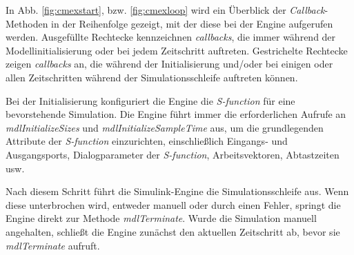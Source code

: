 In Abb. \ref{fig:cmexstart}, bzw. \ref{fig:cmexloop} wird ein Überblick der \textit{Callback}-Methoden in der Reihenfolge gezeigt, mit der diese bei der Engine aufgerufen werden.  Ausgefüllte Rechtecke kennzeichnen \textit{callbacks}, die immer während der Modellinitialisierung oder bei jedem Zeitschritt auftreten. Gestrichelte Rechtecke zeigen \textit{callbacks} an, die während der Initialisierung und/oder bei einigen oder allen Zeitschritten während der Simulationsschleife auftreten können.

Bei der Initialisierung konfiguriert die Engine die \textit{S-function} für eine bevorstehende Simulation. Die Engine führt immer die erforderlichen Aufrufe an \textit{mdlInitializeSizes} und \textit{mdlInitializeSampleTime} aus, um die grundlegenden Attribute der \textit{S-function} einzurichten, einschließlich Eingangs- und Ausgangsports, Dialogparameter der \textit{S-function}, Arbeitsvektoren, Abtastzeiten usw.


Nach diesem Schritt führt die Simulink-Engine die Simulationsschleife aus. Wenn diese unterbrochen wird, entweder manuell oder durch einen Fehler, springt die Engine direkt zur Methode \textit{mdlTerminate}. Wurde die Simulation manuell angehalten, schließt die Engine zunächst den aktuellen Zeitschritt ab, bevor sie \textit{mdlTerminate} aufruft.




